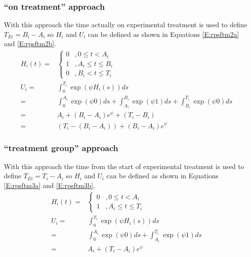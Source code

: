 \subsubsection{``on treatment'' approach}
With this approach the time actually on experimental treatment is used to define $T_{Ei} = B_{i} - A_{i}$ so $H_i$ and $U_i$ can be defined as shown in  Equations \ref{E:rpsftm2a} and \ref{E:rpsftm2b}.
\begin{align}
H_i(t)=& \begin{cases} 
	0 &, 0 \leq t < A_{i} \\ 
    1 &, A_{i} \leq t  \leq B_{i} \\
    0 &, B_{i} < t  \leq T_i
    \end{cases}  \label{E:rpsftm2a}\\
U_i =& \int_0^{T_i} \exp\left(\psi H_i(s) \right) ds \nonumber  \\
    =& \int_0^{A_i} \exp\left(\psi 0 \right) ds + \int_{A_i}^{B_i} \exp\left(\psi 1 \right) ds + \int_{B_i}^{T_i} \exp\left(\psi 0 \right) ds  \nonumber \\
    =& A_i + (B_i-A_i)e^{\psi} + (T_i - B_i) \nonumber \\
    =& (T_i - (B_i - A_i)) + (B_i-A_i)e^{\psi}  \label{E:rpsftm2b}
\end{align}

\subsubsection{``treatment group'' approach}
With this approach the time from the start of experimental treatment is used to define $T_{Ei} = T_{i} - A_{i}$ so $H_i$ and $U_i$ can be defined as shown in  Equations \ref{E:rpsftm3a} and \ref{E:rpsftm3b}.
\begin{align}
H_i(t)=& \begin{cases} 
	0 &, 0 \leq t < A_{i} \\ 
    1 &, A_{i} \leq t  \leq T_{i} 
    \end{cases}  \label{E:rpsftm3a}\\
U_i =& \int_0^{T_i} \exp\left(\psi H_i(s) \right) ds \nonumber  \\
    =& \int_0^{A_i} \exp\left(\psi 0 \right) ds + \int_{A_i}^{T_i} \exp\left(\psi 1 \right) ds  \nonumber \\
    =& A_i + (T_i-A_i)e^{\psi}  \label{E:rpsftm3b}
\end{align}

